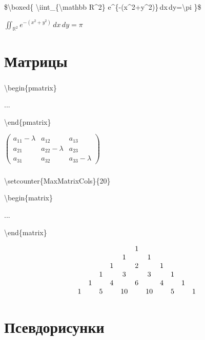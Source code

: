 \documentclass[russian, 14pt]{beamer}
\newcommand{\cm}[1]{{\color{Mycolor3}\textbackslash#1}}
\begin{document}
\begin{frame}
	\frametitle{\insertsection}
	\begin{block}{}
		\$\cm{boxed}\{
			\cm{iint}\_\{\cm{mathbb} R\string^2\}
			e\string^\{-(x\string^2+y\string^2)\}\,dx\,dy=\cm{pi}
		\}\$
	\end{block}
	\LARGE$\boxed{
		\iint_{\mathbb R^2}
		e^{-(x^2+y^2)}\,dx\,dy=\pi
	}$
\end{frame}

\section{Матрицы}

\begin{frame}
	\frametitle{\insertsection}
	\begin{block}{}
		\cm{begin}\{pmatrix\}
		
		
		...
		
		
		\cm{end}\{pmatrix\}
	\end{block}
	\LARGE$\begin{pmatrix}
		a_{11}-\lambda & a_{12}&a_{13}\\
		a_{21}& a_{22}-\lambda &a_{23}\\
		a_{31}& a_{32}&a_{33}-\lambda
	\end{pmatrix}$
\end{frame}

\begin{frame}
	\frametitle{\insertsection}
	\begin{block}{}
		\cm{setcounter}\{MaxMatrixCols\}\{20\}
		
		
		\cm{begin}\{matrix\}
		
		
		...
		
		
		\cm{end}\{matrix\}
	\end{block}
	\[
	\setcounter{MaxMatrixCols}{20}
	\begin{matrix}
		&&&&&& 1\\
		&&&&& 1 && 1\\
		&&&& 1 && 2 && 1\\
		&&& 1 && 3 && 3 && 1\\
		&& 1 && 4 && 6 && 4 && 1\\
		&1 && 5 && 10 && 10 && 5 && 1
	\end{matrix}
	\]
\end{frame}

\section{Псевдорисунки}
\end{document}
